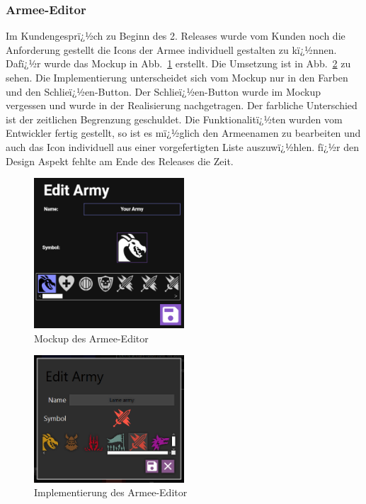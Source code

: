 \documentclass[12pt, titlepage]{scrartcl}
\newcommand{\Abb}[1]{%
	Abb.\ \ref{#1}%
}
\begin{document}
			\subsubsection{Armee-Editor}
			Im Kundengesprï¿½ch zu Beginn des 2. Releases wurde vom Kunden noch die Anforderung gestellt die Icons der Armee individuell gestalten zu kï¿½nnen. Dafï¿½r wurde das Mockup in \Abb{ArmyEditorMockUp} erstellt. Die Umsetzung ist in \Abb{ArmyEditorImplementation} zu sehen. Die Implementierung unterscheidet sich vom Mockup nur in den Farben und den Schlieï¿½en-Button. Der Schlieï¿½en-Button wurde im Mockup vergessen und wurde in der Realisierung nachgetragen. Der farbliche Unterschied ist der zeitlichen Begrenzung geschuldet. Die Funktionalitï¿½ten wurden vom Entwickler fertig gestellt, so ist es mï¿½glich den Armeenamen zu bearbeiten und auch das Icon individuell aus einer vorgefertigten Liste auszuwï¿½hlen. fï¿½r den Design Aspekt fehlte am Ende des Releases die Zeit.
			
			\begin{figure}[H] 
				\centering
				\includegraphics[width=0.5\textwidth]{ArmyEditor.png}
				\caption{Mockup des Armee-Editor}
				\label{ArmyEditorMockUp}
			\end{figure}
		
			\begin{figure}[H] 
				\centering
				\includegraphics[width=0.5\textwidth]{ArmyEditor_final.PNG}
				\caption{Implementierung des Armee-Editor}
				\label{ArmyEditorImplementation}
			\end{figure}
		
\end{document}

